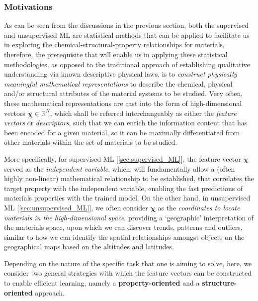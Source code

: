 \subsubsection{Motivations}
\label{sec:descriptor_motivation}

As can be seen from the discussions in the previous section, both the supervised and unsupervised ML are statistical methods that can be applied to facilitate us in exploring the chemical-structural-property relationships for materials, therefore, the prerequisite that will enable us in applying these statistical methodologies, as opposed to the traditional approach of establishing qualitative understanding via known descriptive physical laws, is to \textit{construct physically meaningful mathematical representations} to describe the chemical, physical and/or structural attributes of the material systems to be studied. Very often, these mathematical representations are cast into the form of high-dimensional vectors $\boldsymbol{\chi}\in\mathbb{R}^N$, which shall be referred interchangeably as either the \textit{feature vectors} or \textit{descriptors}, such that we can enrich the information content that has been encoded for a given material, so it can be maximally differentiated from other materials within the set of materials to be studied.


More specifically, for supervised ML [\cref{sec:supervised_ML}], the feature vector $\boldsymbol{\chi}$ served as the \textit{independent variable}, which, will fundamentally allow a (often highly non-linear) mathematical relationship to be established, that correlates the target property with the independent variable, enabling the fast predictions of materials properties with the trained model. On the other hand, in unsupervised ML [\cref{sec:unsupervised_ML}], we often consider $\boldsymbol{\chi}$ as the \textit{coordinates to locate materials in the high-dimensional space}, providing a `geographic' interpretation of the materials space, upon which we can discover trends, patterns and outliers, similar to how we can identify the spatial relationships amongst objects on the geographical maps based on the altitudes and latitudes.  

Depending on the nature of the specific task that one is aiming to solve, here, we consider two general strategies with which  the feature vectors can be constructed to enable efficient learning, namely a \textbf{property-oriented} and a \textbf{structure-oriented} approach. 

